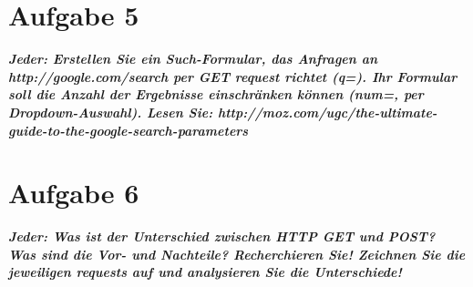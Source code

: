 \documentclass[12pt, a4paper]{report}
\begin{document}
\section*{Aufgabe 5}
\textbf{\textit{Jeder: Erstellen Sie ein Such-Formular, das Anfragen an http://google.com/search
per GET request richtet (q=). Ihr Formular soll die Anzahl der Ergebnisse einschränken
können (num=, per Dropdown-Auswahl).
Lesen Sie: http://moz.com/ugc/the-ultimate-guide-to-the-google-search-parameters}}

\section*{Aufgabe 6}
\textbf{\textit{Jeder: Was ist der Unterschied zwischen HTTP GET und POST? Was sind die Vor- und
Nachteile? Recherchieren Sie! Zeichnen Sie die jeweiligen requests auf und analysieren
Sie die Unterschiede!}}
\end{document}
